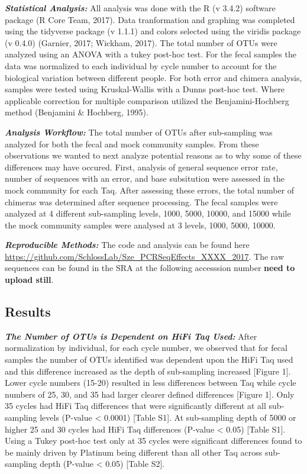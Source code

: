 \documentclass[12pt,]{article}
\begin{document}
\textbf{\emph{Statistical Analysis:}} All analysis was done with the R
(v 3.4.2) software package (R Core Team, 2017). Data tranformation and
graphing was completed using the tidyverse package (v 1.1.1) and colors
selected using the viridis package (v 0.4.0) (Garnier, 2017; Wickham,
2017). The total number of OTUs were analyzed using an ANOVA with a
tukey post-hoc test. For the fecal samples the data was normalized to
each individual by cycle number to account for the biological variation
between different people. For both error and chimera analysis, samples
were tested using Kruskal-Wallis with a Dunns post-hoc test. Where
applicable correction for multiple comparison utilized the
Benjamini-Hochberg method (Benjamini \& Hochberg, 1995).

\textbf{\emph{Analysis Workflow:}} The total number of OTUs after
sub-sampling was analyzed for both the fecal and mock community samples.
From these observations we wanted to next analyze potential reasons as
to why some of these differences may have occured. First, analysis of
general sequence error rate, number of sequences with an error, and base
subsitution were assessed in the mock community for each Taq. After
assessing these errors, the total number of chimeras was determined
after sequence processing. The fecal samples were analyzed at 4
different sub-sampling levels, 1000, 5000, 10000, and 15000 while the
mock community samples were analysed at 3 levels, 1000, 5000, 10000.

\textbf{\emph{Reproducible Methods:}} The code and analysis can be found
here \url{https://github.com/SchlossLab/Sze_PCRSeqEffects_XXXX_2017}.
The raw sequences can be found in the SRA at the following accesssion
number \textbf{need to upload still}.

\newpage

\subsection{Results}\label{results}

\textbf{\emph{The Number of OTUs is Dependent on HiFi Taq Used:}} After
normalization by individual, for each cycle number, we observed that for
fecal samples the number of OTUs identified was dependent upon the HiFi
Taq used and this difference increased as the depth of sub-sampling
increased {[}Figure 1{]}. Lower cycle numbers (15-20) resulted in less
differences between Taq while cycle numbers of 25, 30, and 35 had larger
clearer defined differences {[}Figure 1{]}. Only 35 cycles had HiFi Taq
differences that were significantly different at all sub-sampling levels
(P-value \textless{} 0.0001) {[}Table S1{]}. At sub-sampling depth of
5000 or higher 25 and 30 cycles had HiFi Taq differences (P-value
\textless{} 0.05) {[}Table S1{]}. Using a Tukey post-hoc test only at 35
cycles were significant differences found to be mainly driven by
Platinum being different than all other Taq across sub-sampling depth
(P-value \textless{} 0.05) {[}Table S2{]}.
\end{document}
